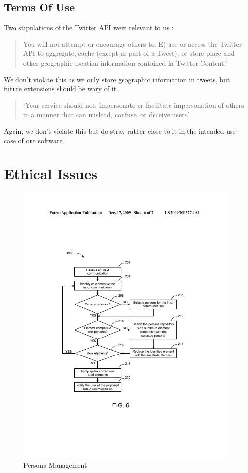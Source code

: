 \subsection{Terms Of Use}

Two stipulations of the Twitter API were relevant to us \cite{twitterTOS}:

\begin{quotation}You will not attempt or encourage others to: E) use or access the Twitter API to aggregate, 
cache (except as part of a Tweet), or store place and other geographic location information 
contained in Twitter Content.'
\end{quotation}

We don't violate this as we only store geographic information in tweets, but future extensions should be wary of it.

\begin{quotation}
`Your service should not: impersonate or facilitate impersonation of others in a manner that can mislead, confuse, or deceive users.'
\end{quotation}

Again, we don't violate this but do stray rather close to it in the intended use-case of our software.

\section{Ethical Issues}

\begin{figure}[htbp]
	\centering
	\includegraphics[width=0.7\linewidth]{img/persona_management_flow.png}
	\caption{Persona Management}
	\label{fig:persona_management_workflow}
\end{figure}

